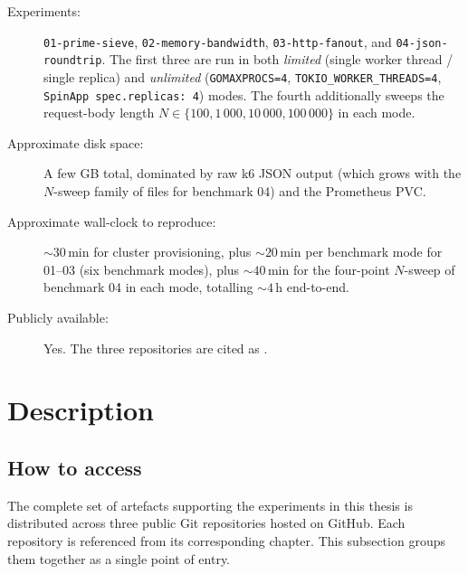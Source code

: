 \begin{description}
    \item[Experiments:] \begin{sloppypar}\texttt{01-prime-sieve}, \texttt{02-memory-bandwidth}, \texttt{03-http-fanout}, and \texttt{04-json-roundtrip}. The first three are run in both \emph{limited} (single worker thread / single replica) and \emph{unlimited} (\texttt{GOMAXPROCS=4}, \texttt{TOKIO\_WORKER\_THREADS=4}, \texttt{SpinApp~spec.replicas:~4}) modes. The fourth additionally sweeps the request-body length $N \in \{100, 1\,000, 10\,000, 100\,000\}$ in each mode.\end{sloppypar}
    \item[Approximate disk space:] A few \acs{GB} total, dominated by raw k6 \acs{JSON} output (which grows with the $N$-sweep family of files for benchmark 04) and the Prometheus \acs{PVC}.
    \item[Approximate wall-clock to reproduce:] ${\sim}30$\,min for cluster provisioning, plus ${\sim}20$\,min per benchmark mode for 01--03 (six benchmark modes), plus ${\sim}40$\,min for the four-point $N$-sweep of benchmark 04 in each mode, totalling ${\sim}4$\,h end-to-end.
    \item[Publicly available:] Yes. The three repositories are cited as \cite{musaev2026thesisinfra, musaev2026thesisexperiments, musaev2026thesissource}.
\end{description}

\section{Description}
\subsection{How to access}
\label{sec:repro_how_to_access}

The complete set of artefacts supporting the experiments in this thesis is distributed across three public Git repositories hosted on GitHub. Each repository is referenced from its corresponding chapter. This subsection groups them together as a single point of entry.

